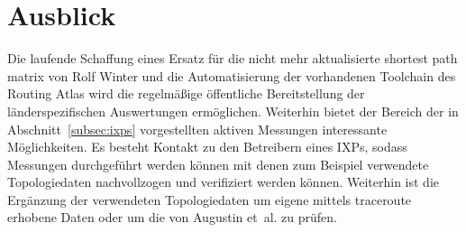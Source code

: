\section{Ausblick}\label{sec:ausblick}
Die laufende Schaffung eines Ersatz für die nicht mehr aktualisierte shortest path matrix von Rolf Winter und die Automatisierung der vorhandenen Toolchain des Routing Atlas wird die regelmäßige öffentliche Bereitstellung der länderspezifischen Auswertungen ermöglichen.
Weiterhin bietet der Bereich der in Abschnitt~\ref{subsec:ixps} vorgestellten aktiven Messungen interessante Möglichkeiten.
Es besteht Kontakt zu den Betreibern eines IXPs, sodass Messungen durchgeführt werden können mit denen zum Beispiel verwendete Topologiedaten nachvollzogen und verifiziert werden können.
Weiterhin ist die Ergänzung der verwendeten Topologiedaten um eigene mittels traceroute erhobene Daten oder um die von Augustin et~al. zu prüfen.
